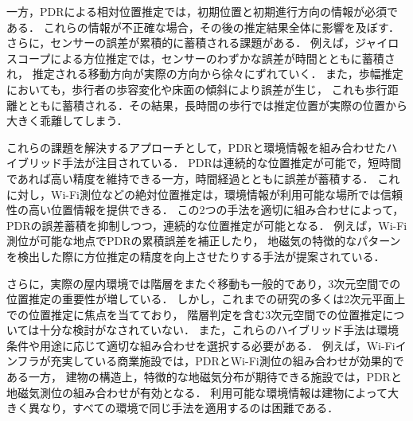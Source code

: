 一方，PDRによる相対位置推定では，初期位置と初期進行方向の情報が必須である．
これらの情報が不正確な場合，その後の推定結果全体に影響を及ぼす．
さらに，センサーの誤差が累積的に蓄積される課題がある．
例えば，ジャイロスコープによる方位推定では，センサーのわずかな誤差が時間とともに蓄積され，
推定される移動方向が実際の方向から徐々にずれていく．
また，歩幅推定においても，歩行者の歩容変化や床面の傾斜により誤差が生じ，
これも歩行距離とともに蓄積される．その結果，長時間の歩行では推定位置が実際の位置から大きく乖離してしまう．

これらの課題を解決するアプローチとして，PDRと環境情報を組み合わせたハイブリッド手法が注目されている．
PDRは連続的な位置推定が可能で，短時間であれば高い精度を維持できる一方，時間経過とともに誤差が蓄積する．
これに対し，Wi-Fi測位などの絶対位置推定は，環境情報が利用可能な場所では信頼性の高い位置情報を提供できる．
この2つの手法を適切に組み合わせによって，PDRの誤差蓄積を抑制しつつ，連続的な位置推定が可能となる．
例えば，Wi-Fi測位が可能な地点でPDRの累積誤差を補正したり，
地磁気の特徴的なパターンを検出した際に方位推定の精度を向上させたりする手法が提案されている．

さらに，実際の屋内環境では階層をまたぐ移動も一般的であり，3次元空間での位置推定の重要性が増している．
しかし，これまでの研究の多くは2次元平面上での位置推定に焦点を当てており，
階層判定を含む3次元空間での位置推定については十分な検討がなされていない．
また，これらのハイブリッド手法は環境条件や用途に応じて適切な組み合わせを選択する必要がある．
例えば，Wi-Fiインフラが充実している商業施設では，PDRとWi-Fi測位の組み合わせが効果的である一方，
建物の構造上，特徴的な地磁気分布が期待できる施設では，PDRと地磁気測位の組み合わせが有効となる．
利用可能な環境情報は建物によって大きく異なり，すべての環境で同じ手法を適用するのは困難である．





